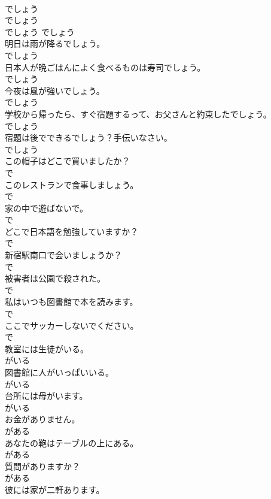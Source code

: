 \documentclass[8pt]{extreport}
\begin{document}
\begin{CJK}{UTF8}{min}
\\	でしょう	
\\	でしょう	
\\	でしょう	でしょう
\\	明日は雨が降るでしょう。	
\\	でしょう
\\	日本人が晩ごはんによく食べるものは寿司でしょう。	
\\	でしょう
\\	今夜は風が強いでしょう。	
\\	でしょう
\\	学校から帰ったら、すぐ宿題するって、お父さんと約束したでしょう。	
\\	でしょう
\\	宿題は後でできるでしょう？手伝いなさい。	
\\	でしょう
\\	この帽子はどこで買いましたか？	
\\	で
\\	このレストランで食事しましょう。	
\\	で
\\	家の中で遊ばないで。	
\\	で
\\	どこで日本語を勉強していますか？	
\\	で
\\	新宿駅南口で会いましょうか？	
\\	で
\\	被害者は公園で殺された。	
\\	で
\\	私はいつも図書館で本を読みます。	
\\	で
\\	ここでサッカーしないでください。	
\\	で
\\	教室には生徒がいる。	
\\	がいる
\\	図書館に人がいっぱいいる。	
\\	がいる
\\	台所には母がいます。	
\\	がいる
\\	お金がありません。	
\\	がある
\\	あなたの鞄はテーブルの上にある。	
\\	がある
\\	質問がありますか？	
\\	がある
\\	彼には家が二軒あります。	

\end{CJK}
\end{document}
